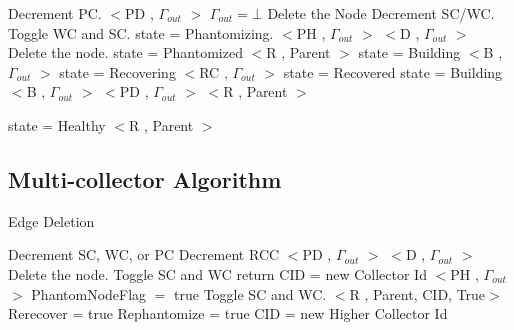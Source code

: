 \begin{algorithm}[H]
	\scriptsize
\begin{algorithmic}[1]
	\State Decrement PC.
	  \State $<$PD , $\Gamma_{out}$ $>$ 
    $\Gamma_{out} = \bot$
  \EndIf
		\State Delete the Node
	\EndIf
{}
	\State Decrement SC/WC.
		\State Toggle WC and SC.
		\State state = Phantomizing.
		\State $<$PH , $\Gamma_{out}$ $>$
		\State $<$D , $\Gamma_{out}$ $>$	
		\State Delete the node.
	\EndIf
{} 
		\State state = Phantomized
			\State $<$R , Parent $>$
		\Else
				\State state = Building
				\State $<$B , $\Gamma_{out}$ $>$
			\Else
				\State state = Recovering
				\State $<$RC , $\Gamma_{out}$ $>$
			\EndIf
		\EndIf
		\State state = Recovered
			\State state = Building
			\State $<$B , $\Gamma_{out}$ $>$
		\Else
				\State $<$PD , $\Gamma_{out}$ $>$
			\Else	
				\State  $<$R , Parent $>$
			\EndIf
		\EndIf
		\end{algorithmic}
	\end{algorithm}
	\begin{algorithm}[H]
		\scriptsize
		\begin{algorithmic}[1]
		\State state = Healthy
			\State  $<$R , Parent $>$
		\EndIf
	\EndIf
\EndIf
\EndProcedure
\end{algorithmic}
\end{algorithm}	


\subsection{Multi-collector Algorithm}
\label{multialgo}
\begin{algorithm}[H]
\caption{Edge Deletion}
\label{Link Deletion}
\scriptsize
\begin{algorithmic}[1]
\State Decrement SC, WC, or PC
    \State Decrement RCC
  \EndIf
			\State $<$PD , $\Gamma_{out}$ $>$
			\State $<$D , $\Gamma_{out}$ $>$
			\State Delete the node.
		\EndIf
		\State Toggle SC and WC
      \State return
    \EndIf
		\State CID = new Collector Id
		\State $<$PH , $\Gamma_{out}$ $>$
		\State PhantomNodeFlag $=$ true
		\State Toggle SC and WC.
				\State $<$R , Parent, CID, True$>$
		\EndIf
			\State Rerecover = true
			\State Rephantomize = true
		\EndIf
	  \State CID = new Higher Collector Id
	\EndIf
\EndProcedure
\end{algorithmic}
\end{algorithm}	

